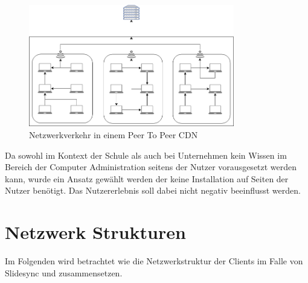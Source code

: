 \begin{figure}[!h]
	\centering
	\includegraphics[width=0.8\textwidth]{figures/network_p2p}
	\caption[A Figure Short-Title]{Netzwerkverkehr in einem Peer To Peer CDN}
	\label{fig:mesh}
\end{figure}

Da sowohl im Kontext der Schule als auch bei Unternehmen kein Wissen im Bereich der Computer Administration seitens der Nutzer vorausgesetzt werden kann, wurde ein Ansatz gewählt werden der keine Installation auf Seiten der Nutzer benötigt. Das Nutzererlebnis soll dabei nicht negativ beeinflusst werden. 



% 
%
%
%


%
%

\section{Netzwerk Strukturen}

Im Folgenden wird betrachtet wie die Netzwerkstruktur der Clients im Falle von Slidesync und \schulCloud zusammensetzen.
